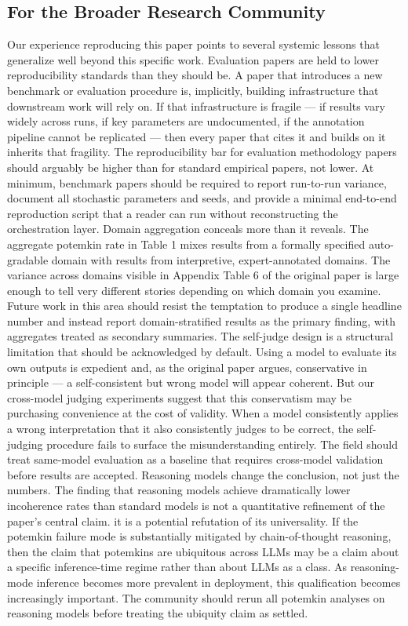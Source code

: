 \documentclass[sigconf,authordraft]{acmart}
\begin{document}
\subsection{For the Broader Research Community}
Our experience reproducing this paper points to several systemic lessons that generalize well beyond this specific work.
Evaluation papers are held to lower reproducibility standards than they should be. A paper that introduces a new benchmark or evaluation procedure is, implicitly, building infrastructure that downstream work will rely on. If that infrastructure is fragile — if results vary widely across runs, if key parameters are undocumented, if the annotation pipeline cannot be replicated — then every paper that cites it and builds on it inherits that fragility. The reproducibility bar for evaluation methodology papers should arguably be higher than for standard empirical papers, not lower. At minimum, benchmark papers should be required to report run-to-run variance, document all stochastic parameters and seeds, and provide a minimal end-to-end reproduction script that a reader can run without reconstructing the orchestration layer.
Domain aggregation conceals more than it reveals. The aggregate potemkin rate in Table 1 mixes results from a formally specified auto-gradable domain with results from interpretive, expert-annotated domains. The variance across domains visible in Appendix Table 6 of the original paper is large enough to tell very different stories depending on which domain you examine. Future work in this area should resist the temptation to produce a single headline number and instead report domain-stratified results as the primary finding, with aggregates treated as secondary summaries.
The self-judge design is a structural limitation that should be acknowledged by default. Using a model to evaluate its own outputs is expedient and, as the original paper argues, conservative in principle — a self-consistent but wrong model will appear coherent. But our cross-model judging experiments suggest that this conservatism may be purchasing convenience at the cost of validity. When a model consistently applies a wrong interpretation that it also consistently judges to be correct, the self-judging procedure fails to surface the misunderstanding entirely. The field should treat same-model evaluation as a baseline that requires cross-model validation before results are accepted.
Reasoning models change the conclusion, not just the numbers. The finding that reasoning models achieve dramatically lower incoherence rates than standard models is not a quantitative refinement of the paper's central claim. it is a potential refutation of its universality. If the potemkin failure mode is substantially mitigated by chain-of-thought reasoning, then the claim that potemkins are ubiquitous across LLMs may be a claim about a specific inference-time regime rather than about LLMs as a class. As reasoning-mode inference becomes more prevalent in deployment, this qualification becomes increasingly important. The community should rerun all potemkin analyses on reasoning models before treating the ubiquity claim as settled.
\end{document}
